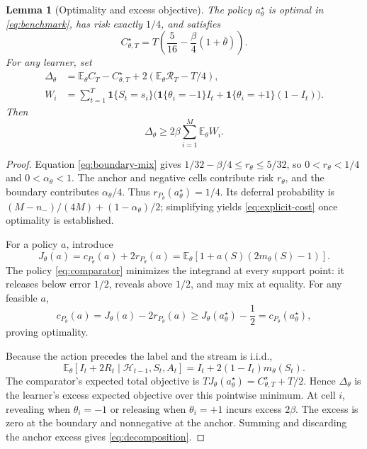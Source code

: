 \documentclass[11pt]{article}
\newtheorem{lemma}[theorem]{Lemma}
\theoremstyle{remark}
\newcommand{\E}{\mathbb E}
\newcommand{\ind}{\mathbf 1}
\newcommand{\calR}{\mathcal R}
\newcommand{\calH}{\mathcal H}
\begin{document}
\begin{lemma}[Optimality and excess objective]
\label{lem:comparator}
The policy $a^\star_\theta$ is optimal in \eqref{eq:benchmark}, has risk
exactly $1/4$, and satisfies
\begin{equation}
 C^\star_{\theta,T}
 =T\left(\frac5{16}-\frac\beta4(1+\bar\theta)\right).
 \label{eq:explicit-cost}
\end{equation}
For any learner, set
\begin{align}
 \Delta_\theta
 &=\E_\theta C_T-C^\star_{\theta,T}
   +2(\E_\theta\calR_T-T/4),\label{eq:priced-gap}\\
 W_i
 &=\sum_{t=1}^T\ind\{S_t=s_i\}
   \bigl(\ind\{\theta_i=-1\}I_t
        +\ind\{\theta_i=+1\}(1-I_t)\bigr).
 \label{eq:wrong-actions}
\end{align}
Then
\begin{equation}
 \Delta_\theta\ge2\beta\sum_{i=1}^M\E_\theta W_i.
 \label{eq:decomposition}
\end{equation}
\end{lemma}
\begin{proof}
Equation \eqref{eq:boundary-mix} gives
$1/32-\beta/4\le r_\theta\le5/32$, so $0<r_\theta<1/4$
and $0<\alpha_\theta<1$. The anchor and negative cells contribute risk
$r_\theta$, and the boundary contributes $\alpha_\theta/4$.
Thus $r_{P_\theta}(a^\star_\theta)=1/4$. Its deferral probability is
$(M-n_-)/(4M)+(1-\alpha_\theta)/2$; simplifying yields
\eqref{eq:explicit-cost} once optimality is established.

For a policy $a$, introduce
\[
 J_\theta(a)=c_{P_\theta}(a)+2r_{P_\theta}(a)
 =\E_\theta[1+a(S)(2m_\theta(S)-1)].
\]
The policy \eqref{eq:comparator} minimizes the integrand at every support
point: it releases below error $1/2$, reveals above $1/2$, and may mix
at equality. For any feasible $a$,
\[
 c_{P_\theta}(a)
 =J_\theta(a)-2r_{P_\theta}(a)
 \ge J_\theta(a^\star_\theta)-\frac12
 =c_{P_\theta}(a^\star_\theta),
\]
proving optimality.

Because the action precedes the label and the stream is i.i.d.,
\[
 \E_\theta[I_t+2R_t\mid\calH_{t-1},S_t,A_t]
 =I_t+2(1-I_t)m_\theta(S_t).
\]
The comparator's expected total objective is
$TJ_\theta(a^\star_\theta)=C^\star_{\theta,T}+T/2$.
Hence $\Delta_\theta$ is the learner's excess expected objective over
this pointwise minimum. At cell $i$, revealing when $\theta_i=-1$
or releasing when $\theta_i=+1$ incurs excess $2\beta$.
The excess is zero at the boundary and nonnegative at the anchor.
Summing and discarding the anchor excess gives \eqref{eq:decomposition}.
\end{proof}
\end{document}
